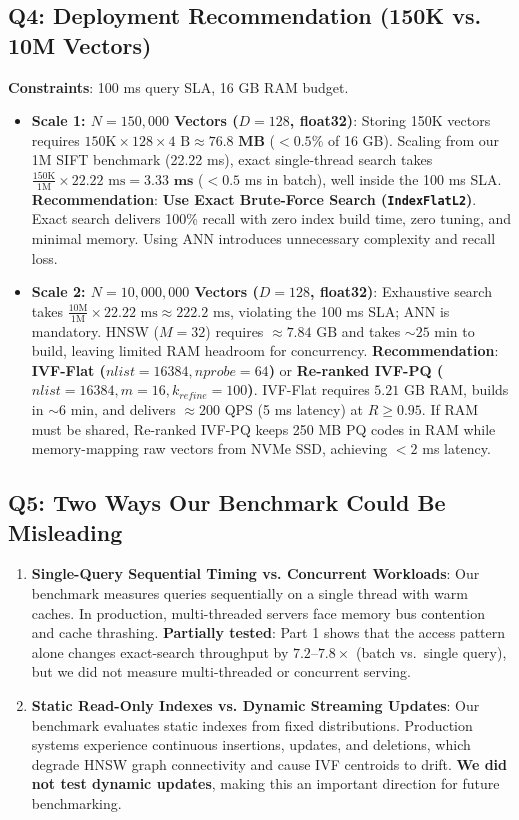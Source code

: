 \documentclass[10pt,twocolumn,a4paper]{article}
\begin{document}
\subsection{Q4: Deployment Recommendation (150K vs. 10M Vectors)}
\textbf{Constraints}: 100 ms query SLA, 16 GB RAM budget.
\begin{itemize}
    \item \textbf{Scale 1: $N = 150,000$ Vectors ($D=128$, float32)}: Storing 150K vectors requires $150\text{K} \times 128 \times 4\text{ B} \approx \mathbf{76.8\text{ MB}}$ ($<0.5\%$ of 16 GB). Scaling from our 1M SIFT benchmark (22.22 ms), exact single-thread search takes $\frac{150\text{K}}{1\text{M}} \times 22.22\text{ ms} = \mathbf{3.33\text{ ms}}$ ($<0.5$ ms in batch), well inside the 100 ms SLA. \textbf{Recommendation}: \textbf{Use Exact Brute-Force Search (\texttt{IndexFlatL2})}. Exact search delivers 100\% recall with zero index build time, zero tuning, and minimal memory. Using ANN introduces unnecessary complexity and recall loss.
    \item \textbf{Scale 2: $N = 10,000,000$ Vectors ($D=128$, float32)}: Exhaustive search takes $\frac{10\text{M}}{1\text{M}} \times 22.22\text{ ms} \approx 222.2\text{ ms}$, violating the 100 ms SLA; ANN is mandatory. HNSW ($M=32$) requires $\approx 7.84\text{ GB}$ and takes $\sim 25$ min to build, leaving limited RAM headroom for concurrency. \textbf{Recommendation}: \textbf{IVF-Flat ($nlist=16384, nprobe=64$)} or \textbf{Re-ranked IVF-PQ ($nlist=16384, m=16, k_{refine}=100$)}. IVF-Flat requires $5.21\text{ GB}$ RAM, builds in $\sim 6$ min, and delivers $\approx 200$ QPS (5 ms latency) at $R \ge 0.95$. If RAM must be shared, Re-ranked IVF-PQ keeps 250 MB PQ codes in RAM while memory-mapping raw vectors from NVMe SSD, achieving $<2$ ms latency.
\end{itemize}

\subsection{Q5: Two Ways Our Benchmark Could Be Misleading}
\begin{enumerate}
    \item \textbf{Single-Query Sequential Timing vs. Concurrent Workloads}: Our benchmark measures queries sequentially on a single thread with warm caches. In production, multi-threaded servers face memory bus contention and cache thrashing. \textbf{Partially tested}: Part 1 shows that the access pattern alone changes exact-search throughput by $7.2$--$7.8\times$ (batch vs.\ single query), but we did not measure multi-threaded or concurrent serving.
    \item \textbf{Static Read-Only Indexes vs. Dynamic Streaming Updates}: Our benchmark evaluates static indexes from fixed distributions. Production systems experience continuous insertions, updates, and deletions, which degrade HNSW graph connectivity and cause IVF centroids to drift. \textbf{We did not test dynamic updates}, making this an important direction for future benchmarking.
\end{enumerate}
\end{document}
